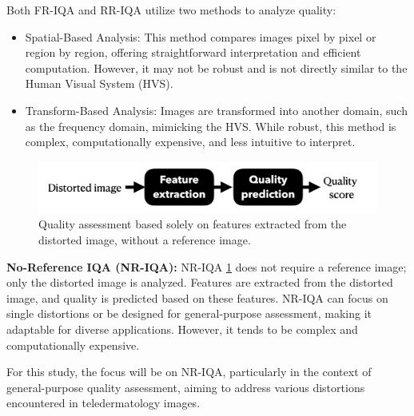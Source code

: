 \vspace{\baselineskip}
Both FR-IQA and RR-IQA utilize two methods to analyze quality:
\begin{itemize}
    \item Spatial-Based Analysis: This method compares images pixel by pixel or region by region, offering straightforward interpretation and efficient computation. However, it may not be robust and is not directly similar to the Human Visual System (HVS).
    \item Transform-Based Analysis: Images are transformed into another domain, such as the frequency domain, mimicking the HVS. While robust, this method is complex, computationally expensive, and less intuitive to interpret.
\end{itemize}
\vspace{\baselineskip}
\begin{figure}[ht]
    \centering
    \includegraphics[keepaspectratio,width=15cm]{img/NRIQA.png}
    \caption{Quality assessment based solely on features extracted from the distorted image, without a reference image.}
    \label{fig:NRIQA}
\end{figure}
\noindent
\textbf{No-Reference IQA (NR-IQA):} NR-IQA \ref{fig:NRIQA} does not require a reference image; only the distorted image is analyzed. Features are extracted from the distorted image, and quality is predicted based on these features. NR-IQA can focus on single distortions or be designed for general-purpose assessment, making it adaptable for diverse applications. However, it tends to be complex and computationally expensive. \par
\vspace{\baselineskip}
For this study, the focus will be on NR-IQA, particularly in the context of general-purpose quality assessment, aiming to address various distortions encountered in teledermatology images.

